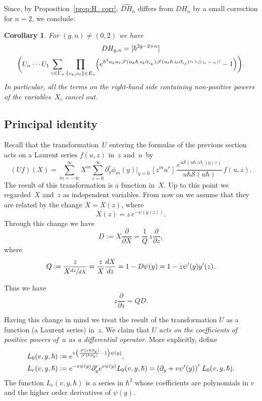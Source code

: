 \documentclass[11pt]{article}
\let\mathcal\mathscr
\theoremstyle{plain}
\newtheorem{corollary}[theorem]{Corollary}
\theoremstyle{definition}
\theoremstyle{remark}
\newcommand{\cS}{\mathcal{S}}
\begin{document}
Since, by Proposition~\ref{prop:H_corr}, $\widehat{DH}_n$ differs from $DH_n$ by a small correction for $n=2$, we conclude:

\begin{corollary}\label{cor:preDHgn}
For $(g,n)\ne(0,2)$ we have
\begin{multline}\label{eq:preDHgn}
DH_{g,n}=[\hbar^{2g-2+n}]\\
\biggl(U_n\cdots U_1
\sum_{\gamma \in \Gamma_n}\prod_{\{v_k,v_\ell\}\in E_\gamma}
\Bigl(e^{\hbar^2u_ku_\ell\cS(u_k\hbar\,z_k\partial_{z_k})\cS(u_\ell\hbar\,z_\ell \partial_{z_\ell})
\sfrac{z_k z_\ell}{(z_k-z_\ell)^2}}-1\Bigr)
\biggr).
\end{multline}
In particular, all the terms on the right-hand side containing non-positive powers of the variables~$X_i$ cancel out.
\end{corollary}

\subsection{Principal identity}\label{sec:princid}

Recall that the transformation~$U$ entering the formulas of the previous section acts on a Laurent series $f(u,z)$ in~$z$ and~$u$~by
\begin{equation*}
(U f)(X)=\sum_{m=-\infty}^\infty X^{m}\sum_{r=0}^\infty
\partial_y^{r}\phi_{m}(y)\big|_{y=0}\,[z^mu^r]\,
\frac{e^{ u\cS(u\hbar\,z\partial_z)y(z) }}{u\hbar\cS(u\hbar)}\,f(u,z).
\end{equation*}
The result of this transformation is a function in~$X$. Up to this point we regarded~$X$ and~$z$ as independent variables. From now on we assume that they are related by the change $X=X(z)$, where
\begin{equation}\label{eq:Xdef}
X(z)=z\,e^{-\psi(y(z))}.
\end{equation}
Through this change we have
\[
D:=X\frac{\partial}{\partial X}=\frac{1}{Q}\,z\frac{\partial}{\partial z},
\]
where
\[
Q:=\frac{z}{X\sfrac{dz}{dX}}=\frac{z}{X}\frac{dX}{dz}=1-D\psi(y)=1-z\psi'(y)y'(z).
\]

Thus we have
\begin{equation*}\label{eq:zdzQD}
z\dfrac{\partial}{\partial z} = QD.
\end{equation*}

Having this change in mind we treat the result of the transformation $U$ as a function (a Laurent series) in~$z$. We claim that \emph{$U$ acts on the coefficients of positive powers of~$u$ as a differential operator}. More explicitly, define
\begin{align}
L_0(v,y,\hbar)&:=e^{v\left(\frac{\cS(v\hbar\partial_y)}{\cS(\hbar\partial_y)}-1\right)\psi(y)},\notag\\ \label{eq:Lrdef}
L_r(v,y,\hbar)&:=e^{-v\psi(y)}\partial_y^re^{v\psi(y)}L_0(v,y,\hbar)
=\left(\partial_y+v\psi'(y)\right)^rL_0(v,y,\hbar).
\end{align}
The function $L_r(v,y,\hbar)$ is a series in $\hbar^2$ whose coefficients are polynomials in $v$ and the higher order derivatives of $\psi(y)$.
\end{document}
